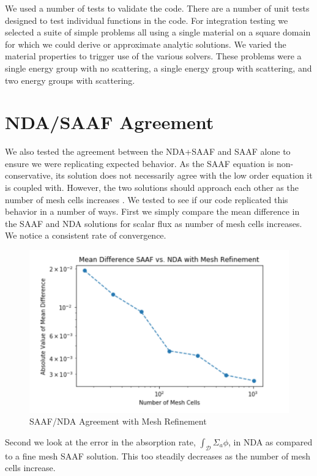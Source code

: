 We used a number of tests to validate the code. There are a number of unit tests designed to test individual functions in the code. For integration testing we selected a suite of simple problems all using a single material on a square domain for which we could derive or approximate analytic solutions. We varied the material properties to trigger use of the various solvers. These problems were a single energy group with no scattering, a single energy group with scattering, and two energy groups with scattering. 

\section{NDA/SAAF Agreement}
We also tested the agreement between the NDA+SAAF and SAAF alone to ensure we were replicating expected behavior. As the SAAF equation is non-conservative, its solution does not necessarily agree with the low order equation it is coupled with. However, the two solutions should approach each other as the number of mesh cells increases \cite{Wang2013}. We tested to see if our code replicated this behavior in a number of ways. First we simply compare the mean difference in the SAAF and NDA solutions for scalar flux as number of mesh cells increases. We notice a consistent rate of convergence. 
\begin{figure}
    \centering
    \includegraphics[width=.75\textwidth]{fig/NDAvsSAAF.png}
    \caption{SAAF/NDA Agreement with Mesh Refinement}
    \label{fig:SAAFvsNDA}
\end{figure}

Second we look at the error in the absorption rate, $\int_\mathcal{D}\Sigma_a\phi$, in NDA as compared to a fine mesh SAAF solution. This too steadily decreases as the number of mesh cells increase.

